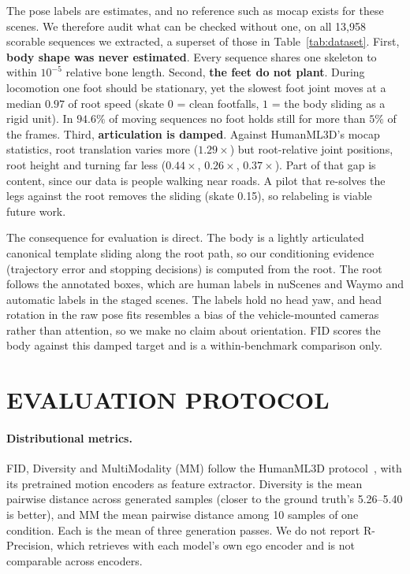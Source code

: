 \documentclass[letterpaper, 10 pt, conference]{ieeeconf}
\begin{document}
The pose labels are estimates, and no reference such as mocap exists for these scenes. We therefore audit what can be checked without one, on all 13{,}958 scorable sequences we extracted, a superset of those in Table~\ref{tab:dataset}.
First, \textbf{body shape was never estimated}. Every sequence shares one skeleton to within $10^{-5}$ relative bone length.
Second, \textbf{the feet do not plant}. During locomotion one foot should be stationary, yet the slowest foot joint moves at a median $0.97$ of root speed (skate $0$ = clean footfalls, $1$ = the body sliding as a rigid unit). In $94.6\%$ of moving sequences no foot holds still for more than $5\%$ of the frames.
Third, \textbf{articulation is damped}. Against HumanML3D's mocap statistics, root translation varies more ($1.29\times$) but root-relative joint positions, root height and turning far less ($0.44\times$, $0.26\times$, $0.37\times$). Part of that gap is content, since our data is people walking near roads.
A pilot that re-solves the legs against the root removes the sliding (skate 0.15), so relabeling is viable future work.

The consequence for evaluation is direct. The body is a lightly articulated canonical template sliding along the root path, so our conditioning evidence (trajectory error and stopping decisions) is computed from the root. The root follows the annotated boxes, which are human labels in nuScenes and Waymo and automatic labels in the staged scenes. The labels hold no head yaw, and head rotation in the raw pose fits resembles a bias of the vehicle-mounted cameras rather than attention, so we make no claim about orientation. FID scores the body against this damped target and is a within-benchmark comparison only.

\section{EVALUATION PROTOCOL}
\label{sec:eval}

\paragraph{Distributional metrics.}
FID, Diversity and MultiModality (MM) follow the HumanML3D protocol~\cite{guo2022humanml3d}, with its pretrained motion encoders as feature extractor. Diversity is the mean pairwise distance across generated samples (closer to the ground truth's 5.26--5.40 is better), and MM the mean pairwise distance among 10 samples of one condition. Each is the mean of three generation passes. We do not report R-Precision, which retrieves with each model's own ego encoder and is not comparable across encoders.
\end{document}
